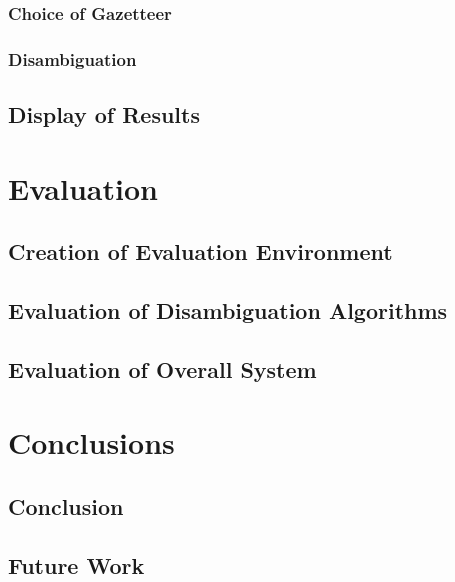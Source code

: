 \documentclass[12pt, a4paper]{report}
\begin{document}
\subsection{Choice of Gazetteer}



\subsection{Disambiguation}


\section{Display of Results}



\chapter{Evaluation}

\section{Creation of Evaluation Environment}

\section{Evaluation of Disambiguation Algorithms}


\section{Evaluation of Overall System}


\chapter{Conclusions}

\section{Conclusion}

\section{Future Work}




\end{document}
